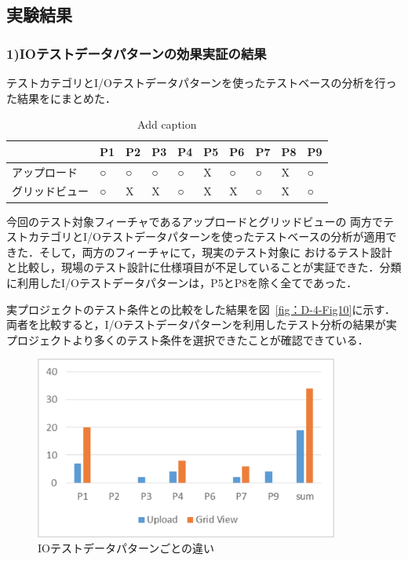 \subsection{実験結果} \label{sec:4-2-3}
\subsubsection{1)IOテストデータパターンの効果実証の結果}
テストカテゴリとI/Oテストデータパターンを使ったテストベースの分析を行った結果をにまとめた．

\begin{table}[htbp]
  \centering
  \caption{Add caption}
    \begin{tabular}{|p{4em}|p{4em}|p{4em}|p{4em}|p{4em}|p{2em}|p{1.915em}|p{4em}|p{4em}|p{4em}|}
    \hline
    \multicolumn{1}{|r|}{} & \multicolumn{1}{l|}{P1} & \multicolumn{1}{l|}{P2} & \multicolumn{1}{l|}{P3} & \multicolumn{1}{l|}{P4} & \multicolumn{1}{l|}{P5} & \multicolumn{1}{l|}{P6} & \multicolumn{1}{l|}{P7} & \multicolumn{1}{l|}{P8} & \multicolumn{1}{l|}{P9} \bigstrut\\
    \hline
    アップロード & ○     & ○     & ○     & ○     & X     & ○     & ○     & X     & ○ \bigstrut\\
    \hline
    グリッドビュー & ○     & X     & X     & ○     & X     & X     & ○     & X     & ○ \bigstrut\\
    \hline
    \end{tabular}%
  \label{tab:addlabel}%
\end{table}%


今回のテスト対象フィーチャであるアップロードとグリッドビューの 両方でテストカテゴリとI/Oテストデータパターンを使ったテストベースの分析が適用できた．そして，両方のフィーチャにて，現実のテスト対象に おけるテスト設計と比較し，現場のテスト設計に仕様項目が不足していることが実証できた．分類に利用したI/Oテストデータパターンは，P5とP8を除く全てであった．


実プロジェクトのテスト条件との比較をした結果を図~\ref{fig：D-4-Fig10}に示す．
両者を比較すると，I/Oテストデータパターンを利用したテスト分析の結果が実プロジェクトより多くのテスト条件を選択できたことが確認できている．

\begin{figure}[htbp]
\begin{center}
\includegraphics[width=10cm]{./image/D-4-Fig11.png}
\caption{IOテストデータパターンごとの違い}
\label{fig:D-4-Fig10}
\end{center}
\end{figure}

